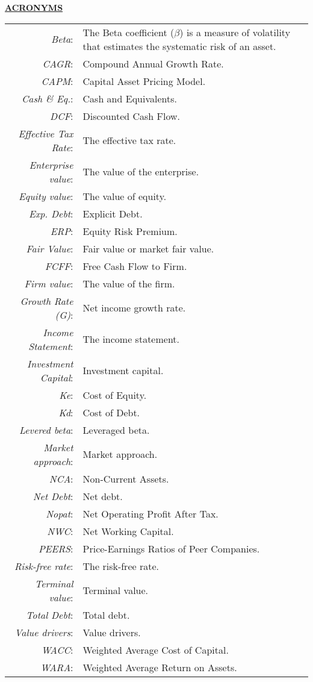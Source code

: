 \begin{center}
	\underline{\textbf{\textcolor{principal}{ACRONYMS}}}
\end{center}

\begin{table}[H]
 	\begin{tabular}{rp{10cm}}
	
\textit{Beta}:& The Beta coefficient ($\beta$) is a measure of volatility that estimates the systematic risk of an asset.\\
\textit{CAGR}:& Compound Annual Growth Rate.\\
\textit{CAPM}:& Capital Asset Pricing Model.\\
\textit{Cash \& Eq.}:& Cash and Equivalents.\\
\textit{DCF}:& Discounted Cash Flow.\\
\textit{Effective Tax Rate}:& The effective tax rate.\\
\textit{Enterprise value}:& The value of the enterprise.\\
\textit{Equity value}:& The value of equity.\\
\textit{Exp. Debt}:& Explicit Debt.\\
\textit{ERP}:& Equity Risk Premium.\\
\textit{Fair Value}:& Fair value or market fair value.\\
\textit{FCFF}:& Free Cash Flow to Firm.\\
\textit{Firm value}:& The value of the firm.\\
\textit{Growth Rate (G)}:& Net income growth rate.\\
\textit{Income Statement}:& The income statement.\\
\textit{Investment Capital}:& Investment capital.\\
\textit{Ke}:& Cost of Equity.\\
\textit{Kd}:& Cost of Debt.\\
\textit{Levered beta}:& Leveraged beta.\\
\textit{Market approach}:& Market approach.\\
\textit{NCA}:& Non-Current Assets.\\
\textit{Net Debt}:& Net debt.\\
\textit{Nopat}:& Net Operating Profit After Tax.\\
\textit{NWC}:& Net Working Capital.\\
\textit{PEERS}:& Price-Earnings Ratios of Peer Companies.\\
\textit{Risk-free rate}:& The risk-free rate.\\
\textit{Terminal value}:& Terminal value.\\
\textit{Total Debt}:& Total debt.\\
\textit{Value drivers}:& Value drivers.\\
\textit{WACC}:& Weighted Average Cost of Capital.\\
\textit{WARA}:& Weighted Average Return on Assets.\\



\end{tabular}
\end{table}
